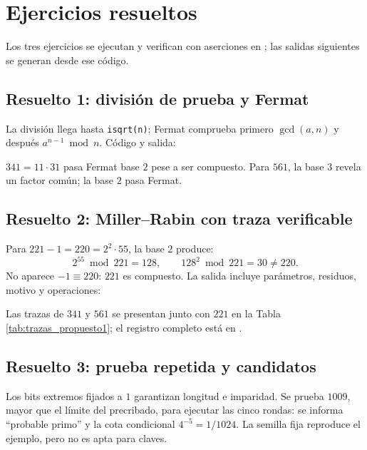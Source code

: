\section{Ejercicios resueltos}
Los tres ejercicios se ejecutan y verifican con aserciones en ; las salidas siguientes se generan desde ese código.

\subsection{Resuelto 1: división de prueba y Fermat}
La división llega hasta \texttt{isqrt(n)}; Fermat comprueba primero $\gcd(a,n)$ y después $a^{n-1}\bmod n$. Código y salida:

$341=11\cdot31$ pasa Fermat base $2$ pese a ser compuesto. Para $561$, la base $3$ revela un factor común; la base $2$ pasa Fermat.

\subsection{Resuelto 2: Miller--Rabin con traza verificable}
Para $221-1=220=2^2\cdot55$, la base $2$ produce:
\begin{equation}
2^{55}\bmod221=128,\qquad128^2\bmod221=30\neq220.
\end{equation}
No aparece $-1\equiv220$: $221$ es compuesto. La salida incluye parámetros, residuos, motivo y operaciones:

Las trazas de $341$ y $561$ se presentan junto con $221$ en la Tabla \ref{tab:trazas_propuesto1}; el registro completo está en .

\subsection{Resuelto 3: prueba repetida y candidatos}

Los bits extremos fijados a $1$ garantizan longitud e imparidad. Se prueba $1009$, mayor que el límite del precribado, para ejecutar las cinco rondas: se informa ``probable primo'' y la cota condicional $4^{-5}=1/1024$. La semilla fija reproduce el ejemplo, pero no es apta para claves.
